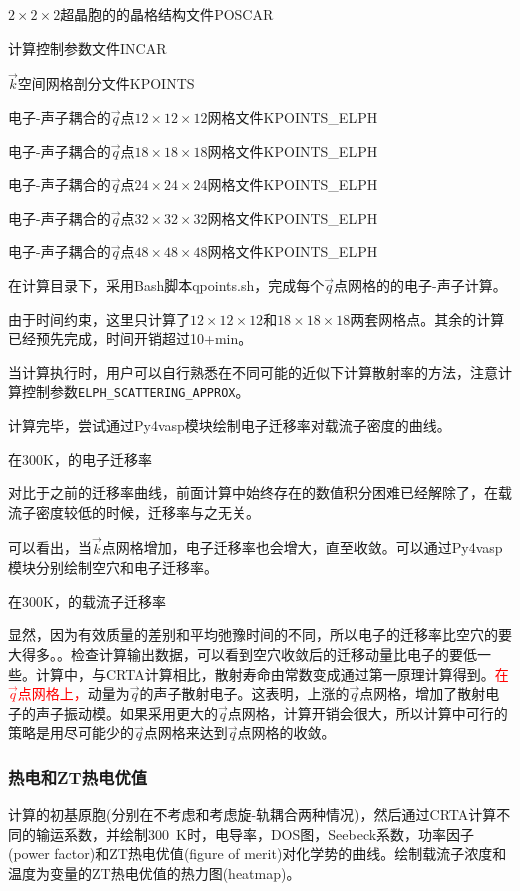 $2\times2\times2$超晶胞的的晶格结构文件\textrm{POSCAR}

计算控制参数文件\textrm{INCAR}

$\vec k$空间网格剖分文件\textrm{KPOINTS}

电子-声子耦合的$\vec q$点$12\times12\times12$网格文件\textrm{KPOINTS\_ELPH}

电子-声子耦合的$\vec q$点$18\times18\times18$网格文件\textrm{KPOINTS\_ELPH}

电子-声子耦合的$\vec q$点$24\times24\times24$网格文件\textrm{KPOINTS\_ELPH}

电子-声子耦合的$\vec q$点$32\times32\times32$网格文件\textrm{KPOINTS\_ELPH}

电子-声子耦合的$\vec q$点$48\times48\times48$网格文件\textrm{KPOINTS\_ELPH}

在计算目录下，采用\textrm{Bash}脚本\textrm{qpoints.sh}，完成每个$\vec q$点网格的的电子-声子计算。

由于时间约束，这里只计算了$12\times12\times12$和$18\times18\times18$两套网格点。其余的计算已经预先完成，时间开销超过\textrm{10+min}。

当计算执行时，用户可以自行熟悉在不同可能的近似下计算散射率的方法，注意计算控制参数\texttt{ELPH\_SCATTERING\_APPROX}。

计算完毕，尝试通过\textrm{Py4vasp}模块绘制电子迁移率对载流子密度的曲线。

在\textrm{300K}，的电子迁移率

对比于之前的迁移率曲线，前面计算中始终存在的数值积分困难已经解除了，在载流子密度较低的时候，迁移率与之无关。

可以看出，当$\vec k$点网格增加，电子迁移率也会增大，直至收敛。可以通过\textrm{Py4vasp}模块分别绘制空穴和电子迁移率。

在\textrm{300K}，的载流子迁移率

显然，因为有效质量的差别和平均弛豫时间的不同，所以电子的迁移率比空穴的要大得多。。检查计算输出数据，可以看到空穴收敛后的迁移动量比电子的要低一些。计算中，与\textrm{CRTA}计算相比，散射寿命由常数变成通过第一原理计算得到。\textcolor{red}{在$\vec q$点网格上，}动量为$\vec q$的声子散射电子。这表明，上涨的$\vec q$点网格，增加了散射电子的声子振动模。如果采用更大的$\vec q$点网格，计算开销会很大，所以计算中可行的策略是用尽可能少的$\vec q$点网格来达到$\vec q$点网格的收敛。

\subsubsection{热电和\rm{ZT}热电优值}
计算的初基原胞(分别在不考虑和考虑旋-轨耦合两种情况)，然后通过\textrm{CRTA}计算不同的输运系数，并绘制\textrm{300~K}时，电导率，\textrm{DOS}图，\textrm{Seebeck}系数，功率因子\textrm{(power factor)}和\textrm{ZT}热电优值\textrm{(figure of merit)}对化学势的曲线。绘制载流子浓度和温度为变量的\textrm{ZT}热电优值的热力图\textrm{(heatmap)}。

